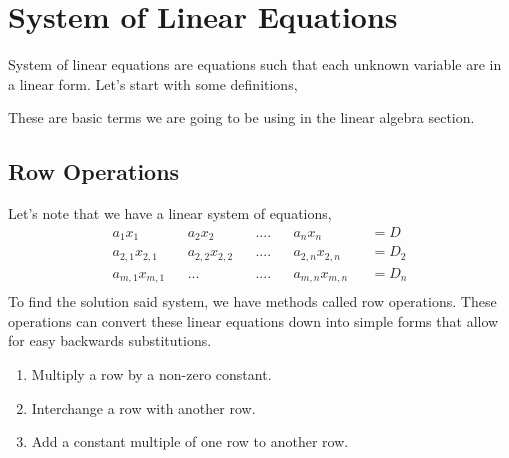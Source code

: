 \chapter{System of Linear Equations}
System of linear equations are equations such that each unknown variable are in a linear form. Let's start with some definitions, 


These are basic terms we are going to be using in the linear algebra section.

\newpage
\section{Row Operations} 
Let's note that we have a linear system of equations, 
\begin{equation*}
\begin{matrix*}
	a_1x_1 && a_2x_2 && .... && a_nx_n && = D\\ 
	a_{2,1}x_{2,1} && a_{2,2}x_{2,2} && .... && a_{2,n}x_{2,n} && =  D_{2} \\ 
	a_{m,1}x_{m,1} && ... && .... && a_{m,n}x_{m,n}  && = D_n \\ 
	
\end{matrix*}
\end{equation*}
To find the solution said system, we have methods called row operations. These operations can convert these linear equations down into simple forms that allow for easy backwards substitutions.
\begin{enumerate}
\item Multiply a row by a non-zero constant.
\item Interchange a row with another row.
\item Add a constant multiple of one row to another row.
\end{enumerate}

